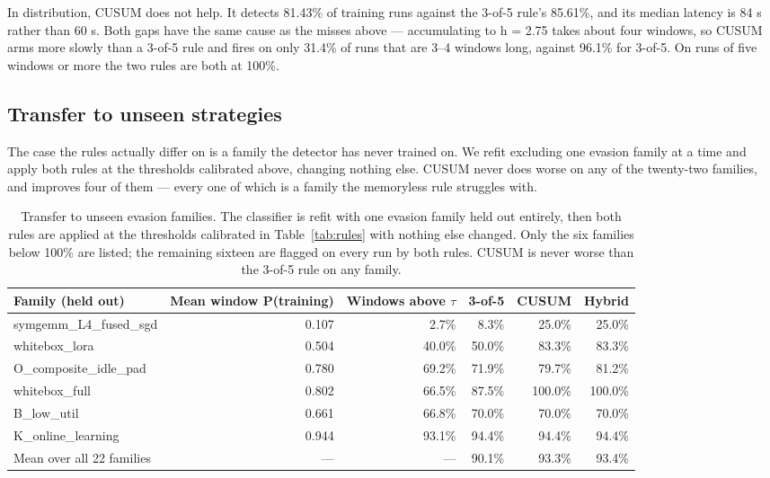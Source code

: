 In distribution, CUSUM does not help. It detects 81.43\% of training runs against the 3-of-5 rule's 85.61\%, and its median latency is 84 s rather than 60 s. Both gaps have the same cause as the misses above --- accumulating to h = 2.75 takes about four windows, so CUSUM arms more slowly than a 3-of-5 rule and fires on only 31.4\% of runs that are 3--4 windows long, against 96.1\% for 3-of-5. On runs of five windows or more the two rules are both at 100\%.

\subsection{Transfer to unseen strategies}

The case the rules actually differ on is a family the detector has never trained on. We refit excluding one evasion family at a time and apply both rules at the thresholds calibrated above, changing nothing else. CUSUM never does worse on any of the twenty-two families, and improves four of them --- every one of which is a family the memoryless rule struggles with.

\begin{table}[htbp]
\centering
\footnotesize
\begin{tabular}{lrrrrr}
\toprule
\textbf{Family (held out)} & \textbf{Mean window P(training)} & \textbf{Windows above $\tau$} & \textbf{3-of-5} & \textbf{CUSUM} & \textbf{Hybrid} \\
\midrule
symgemm\_L4\_fused\_sgd & 0.107 & 2.7\% & 8.3\% & 25.0\% & 25.0\% \\
whitebox\_lora & 0.504 & 40.0\% & 50.0\% & 83.3\% & 83.3\% \\
O\_composite\_idle\_pad & 0.780 & 69.2\% & 71.9\% & 79.7\% & 81.2\% \\
whitebox\_full & 0.802 & 66.5\% & 87.5\% & 100.0\% & 100.0\% \\
B\_low\_util & 0.661 & 66.8\% & 70.0\% & 70.0\% & 70.0\% \\
K\_online\_learning & 0.944 & 93.1\% & 94.4\% & 94.4\% & 94.4\% \\
Mean over all 22 families & --- & --- & 90.1\% & 93.3\% & 93.4\% \\
\bottomrule
\end{tabular}
\caption{Transfer to unseen evasion families. The classifier is refit with one evasion family held out entirely, then both rules are applied at the thresholds calibrated in Table~\ref{tab:rules} with nothing else changed. Only the six families below 100\% are listed; the remaining sixteen are flagged on every run by both rules. CUSUM is never worse than the 3-of-5 rule on any family.}
\label{tab:transfer}
\end{table}

